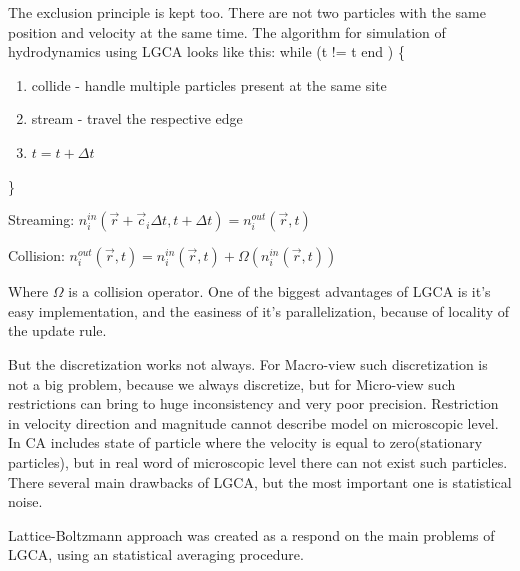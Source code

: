 The exclusion principle is kept too. There are not two particles with the same position and velocity at the same time. The algorithm for simulation of hydrodynamics using LGCA looks like this:
while (t != t end ) \{
\begin{enumerate}
\item collide - handle multiple particles present at the same site 
\item stream - travel the respective edge 
\item $t = t + \Delta t $
\end{enumerate}
\}

Streaming: $ n_i^{in}(\overrightarrow{r}+\overrightarrow{c}_{i}\Delta t, t+\Delta t) = n_i^{out}(\overrightarrow{r}, t)$

Collision: $ n_i^{out}(\overrightarrow{r}, t) = n_i^{in}(\overrightarrow{r}, t) + \Omega(n_i^{in}(\overrightarrow{r}, t)) $

Where $\Omega$ is a collision operator. One of the biggest advantages of LGCA is it's easy implementation, and  the easiness of it's parallelization, because of locality of the update rule.

But the discretization works not always. For Macro-view such discretization is not a big problem, because we always discretize, but for Micro-view such restrictions can bring to huge inconsistency and very poor precision. Restriction in velocity direction and magnitude cannot describe model on microscopic level. In CA includes state of particle where the velocity is equal to zero(stationary particles), but in real word of microscopic level there can not exist such particles. There several main drawbacks of LGCA, but the most important one is statistical noise.

Lattice-Boltzmann approach was created as a respond on the main problems of LGCA, using an statistical averaging procedure.